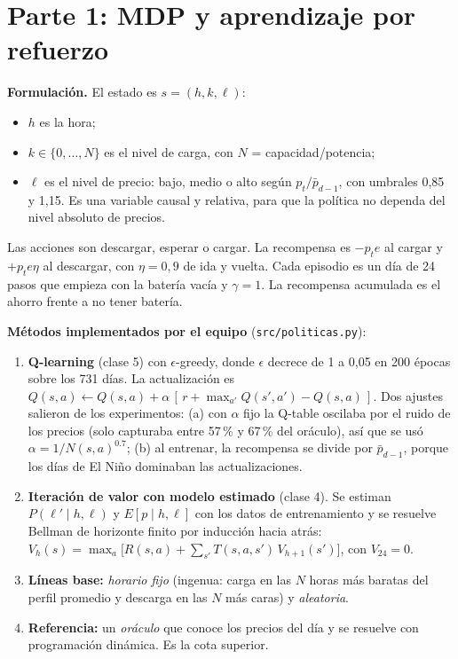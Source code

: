 \documentclass[10pt,letterpaper]{article}
\begin{document}
\section{Parte 1: MDP y aprendizaje por refuerzo}

\textbf{Formulación.} El estado es $s=(h,k,\ell)$:
\begin{itemize}
  \item $h$ es la hora;
  \item $k\in\{0,\dots,N\}$ es el nivel de carga, con $N$ = capacidad/potencia;
  \item $\ell$ es el nivel de precio: bajo, medio o alto según $p_t/\bar p_{d-1}$, con umbrales 0{,}85 y 1{,}15.
        Es una variable causal y relativa, para que la política no dependa del nivel absoluto de precios.
\end{itemize}
Las acciones son descargar, esperar o cargar. La recompensa es $-p_t e$ al cargar y $+p_t e \eta$ al descargar,
con $\eta = 0{,}9$ de ida y vuelta. Cada episodio es un día de 24 pasos que empieza con la batería vacía y
$\gamma = 1$. La recompensa acumulada es el ahorro frente a no tener batería.

\textbf{Métodos implementados por el equipo} (\texttt{src/politicas.py}):
\begin{enumerate}
  \item \textbf{Q-learning} (clase 5) con $\epsilon$-greedy, donde $\epsilon$ decrece de 1 a 0{,}05 en 200 épocas sobre
        los 731 días. La actualización es
        $Q(s,a)\leftarrow Q(s,a)+\alpha\,[\,r+\max_{a'}Q(s',a')-Q(s,a)\,]$.
        Dos ajustes salieron de los experimentos:
        (a) con $\alpha$ fijo la Q-table oscilaba por el ruido de los precios (solo capturaba entre 57\,\% y 67\,\% del oráculo),
        así que se usó $\alpha = 1/N(s,a)^{0.7}$;
        (b) al entrenar, la recompensa se divide por $\bar p_{d-1}$, porque los días de El Niño dominaban las actualizaciones.
  \item \textbf{Iteración de valor con modelo estimado} (clase 4). Se estiman $P(\ell'\mid h,\ell)$ y $E[p\mid h,\ell]$
        con los datos de entrenamiento y se resuelve Bellman de horizonte finito por inducción hacia atrás:
        $V_h(s)=\max_a\big[R(s,a)+\sum_{s'}T(s,a,s')\,V_{h+1}(s')\big]$, con $V_{24}=0$.
  \item \textbf{Líneas base:} \emph{horario fijo} (ingenua: carga en las $N$ horas más baratas del perfil promedio y
        descarga en las $N$ más caras) y \emph{aleatoria}.
  \item \textbf{Referencia:} un \emph{oráculo} que conoce los precios del día y se resuelve con programación dinámica.
        Es la cota superior.
\end{enumerate}
\end{document}
